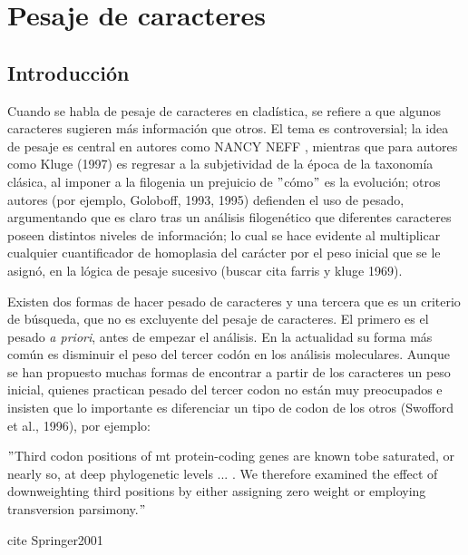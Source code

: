 \chapter{Pesaje de caracteres}
\section*{Introducci\'on}
Cuando se habla de pesaje de caracteres en clad\'istica, se refiere a que algunos caracteres sugieren m\'as informaci\'on que otros. El tema es controversial;
la idea de pesaje es central en autores como NANCY NEFF 
, mientras que para autores como  Kluge (1997) es regresar a la subjetividad de la \'epoca de la taxonom\'ia cl\'asica, al imponer a la filogenia un prejuicio de $"$c\'omo$"$ es la evoluci\'on; 
otros autores (por ejemplo, Goloboff, 1993, 1995) defienden el uso de pesado, argumentando que es claro tras un an\'alisis filogen\'etico que diferentes caracteres poseen distintos niveles de  informaci\'on; lo cual se hace evidente al multiplicar cualquier cuantificador de homoplasia del car\'acter por el peso inicial que se le asign\'o, en la l\'ogica de pesaje sucesivo (buscar cita farris y kluge 1969).


Existen dos formas de hacer pesado de caracteres y una tercera que es un criterio de b\'usqueda, que no es  excluyente del pesaje de caracteres. El primero es el pesado \textit{a priori}, antes de empezar el an\'alisis. 
En la actualidad su forma m\'as com\'un es disminuir el peso del tercer cod\'on en los an\'alisis moleculares. Aunque se han propuesto muchas formas de encontrar a partir de los caracteres un peso inicial, quienes practican pesado del tercer codon no est\'an muy preocupados e insisten que lo importante es diferenciar un tipo de codon de los otros (Swofford et al., 1996), por ejemplo:

\begin{verbatin}
$"$Third codon positions of mt protein-coding genes are known tobe saturated, or nearly so, at deep phylogenetic levels ... . We therefore examined the effect of downweighting third positions by either assigning zero weight or employing transversion parsimony.$"$ 
\end{verbatin}
cite {Springer2001}
% 

